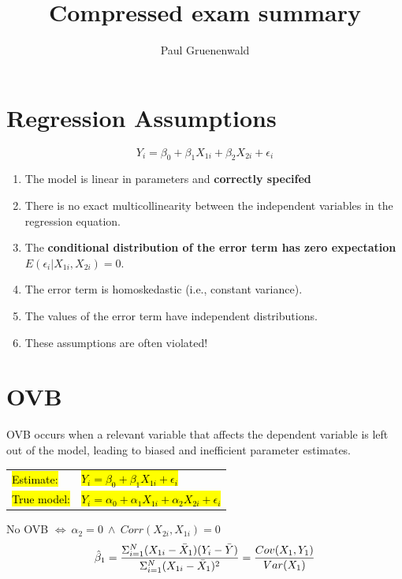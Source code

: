 \documentclass[a3paper, 8pt]{extarticle}
\title{Compressed exam summary}
\author{Paul Gruenenwald}
\begin{document}


\setlength{\abovedisplayskip}{6pt}
\setlength{\belowdisplayskip}{6pt}
\setlength{\abovedisplayshortskip}{5pt}
\setlength{\belowdisplayshortskip}{5pt}
\setlength{\columnseprule}{0.2pt}


\RaggedRight



\begin{multicols*}{5}

\section{Regression Assumptions}
$$Y_i=\beta_0+\beta_1X_{1i}+\beta_2X_{2i}+\epsilon_i$$

\begin{enumerate}
    \item The model is linear in parameters and \textbf{correctly specifed}
    \item There is no exact multicollinearity between the independent variables in the regression equation.
    \item The \textbf{conditional distribution of the error term has zero expectation} $E (\epsilon_i | X_{1i} , X_{2i} ) = 0$.
    \item The error term is homoskedastic (i.e., constant variance).
    \item The values of the error term have independent distributions.
    \item[\Rightarrow] These assumptions are often violated!
\end{enumerate}

\section{OVB}
OVB occurs when a relevant variable that affects the dependent variable is left out of the model, leading to biased and inefficient parameter estimates. 

\begin{tabular}{l l}
   \hl{Estimate:}   & \hl{$Y_i=\beta_0+\beta_1X_{1i}+\epsilon_i$} \\
    \hl{True model:} & \hl{$Y_i=\alpha_0+\alpha_1X_{1i}+\alpha_2X_{2i}+\epsilon_i$}
\end{tabular}

No OVB $\Leftrightarrow \ \alpha_2=0  \ \land \  Corr(X_{2i}, X_{1i})= 0$
$$\hat{\beta}_1=\frac{\Sigma_{i=1}^N (X_{1i}- \Bar{X}_1)(Y_i-\Bar{Y})}{\Sigma_{i=1}^N (X_{1i}- \Bar{X}_1)^2}= \frac{Cov(X_1,Y_1)}{Var(X_1)}$$


\end{multicols*}
\end{document}
